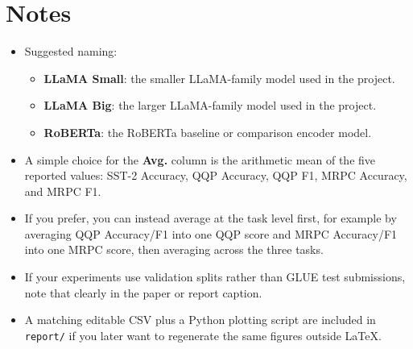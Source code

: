 \documentclass[11pt]{article}
\begin{document}
\section*{Notes}

\begin{itemize}
\item Suggested naming:
\begin{itemize}
\item \textbf{LLaMA Small}: the smaller LLaMA-family model used in the project.
\item \textbf{LLaMA Big}: the larger LLaMA-family model used in the project.
\item \textbf{RoBERTa}: the RoBERTa baseline or comparison encoder model.
\end{itemize}
\item A simple choice for the \textbf{Avg.} column is the arithmetic mean of the five reported values: SST-2 Accuracy, QQP Accuracy, QQP F1, MRPC Accuracy, and MRPC F1.
\item If you prefer, you can instead average at the task level first, for example by averaging QQP Accuracy/F1 into one QQP score and MRPC Accuracy/F1 into one MRPC score, then averaging across the three tasks.
\item If your experiments use validation splits rather than GLUE test submissions, note that clearly in the paper or report caption.
\item A matching editable CSV plus a Python plotting script are included in \texttt{report/} if you later want to regenerate the same figures outside LaTeX.
\end{itemize}
\end{document}
